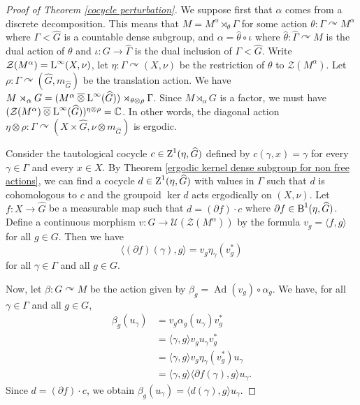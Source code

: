 \documentclass[a4paper,11pt]{amsart}
\numberwithin{equation}{section}
\theoremstyle{definition}
\newcommand{\C}{\mathbb{C}}
\newcommand{\cZ}{\mathcal{Z}}
\newcommand{\Ad}{\operatorname{Ad}}
\newcommand{\rB}{\mathord{\text{\rm B}}}
\newcommand{\rZ}{\mathord{\text{\rm Z}}}
\newcommand{\rL}{\mathord{\text{\rm L}}}
\newcommand{\ovt}{\mathbin{\overline{\otimes}}}
\begin{document}
\begin{proof}[Proof of Theorem \ref{cocycle perturbation}]
    We suppose first that $\alpha$ comes from a discrete decomposition. This means that $M=M^\alpha \rtimes_\theta \Gamma$ for some action $\theta : \Gamma \curvearrowright M^\alpha$ where $\Gamma < \widehat{G}$ is a countable dense subgroup, and $\alpha = \widehat{\theta} \circ \iota$ where $\widehat{\theta} : \widehat{\Gamma} \curvearrowright M$ is the dual action of $\theta$ and $\iota : G \rightarrow \widehat{\Gamma}$ is the dual inclusion of $\Gamma < \widehat{G}$.  Write $\mathcal Z(M^\alpha) = \rL^\infty(X, \nu)$, let $\eta : \Gamma \curvearrowright (X, \nu)$ be the restriction of $\theta$ to $\cZ(M^\alpha)$. Let $\rho : \Gamma \curvearrowright (\widehat{G}, m_{\widehat G})$ be the translation action.    We have $M \rtimes_\alpha G=(M^\alpha \ovt \rL^\infty(\widehat{G})) \rtimes_{\theta \otimes \rho} \Gamma$. Since $M \rtimes_\alpha G$ is a factor, we must have $(\cZ(M^\alpha) \ovt \rL^\infty(\widehat{G}))^{\eta \otimes \rho} = \C$. In other words, the diagonal action $\eta \otimes \rho : \Gamma \curvearrowright (X \times \widehat{G}, \nu \otimes m_{\widehat G})$ is ergodic.

  Consider the tautological cocycle $c \in \rZ^1(\eta,\widehat{G})$ defined by $c(\gamma,x)=\gamma$ for every $\gamma \in \Gamma$ and every $x \in X$. By Theorem \ref{ergodic kernel dense subgroup for non free actions}, we can find a cocycle $d \in \rZ^1(\eta,\widehat{G})$ with values in $\Gamma$ such that $d$ is cohomologous to $c$ and the groupoid $\ker d$ acts ergodically on $(X, \nu)$. Let $f : X \rightarrow \widehat{G}$ be a measurable map such that $d=(\partial f) \cdot c$ where $\partial f \in \rB^1(\eta,\widehat{G})$. Define a continuous morphism $v : G \rightarrow \mathcal{U}(\cZ(M^\alpha))$ by the formula $v_g = \langle f, g \rangle$
   for all $g \in G$. Then we have $$\langle (\partial f)(\gamma), g \rangle =v_g \eta_\gamma(v_g^*)$$ for all $\gamma \in \Gamma$ and all $g \in G$.
   
   Now, let $\beta : G \curvearrowright M $ be the action given by $\beta_g= \Ad(v_g) \circ \alpha_g$. We have, for all $\gamma \in \Gamma$ and all $g \in G$, 
   \begin{align*}
 \beta_g(u_\gamma) &=v_g \alpha_g(u_\gamma) v_g^* \\
 &=\langle \gamma,g \rangle v_g  u_\gamma v_g^* \\
 &= \langle \gamma, g \rangle v_g \eta_\gamma(v_g^*) u_\gamma \\
 &= \langle \gamma, g \rangle \langle \partial f(\gamma), g \rangle  u_\gamma.  
   \end{align*}
  Since $d= (\partial f) \cdot c$, we obtain $\beta_g(u_\gamma)= \langle d(\gamma),g \rangle u_\gamma$. 
   

\end{proof}
\end{document}
